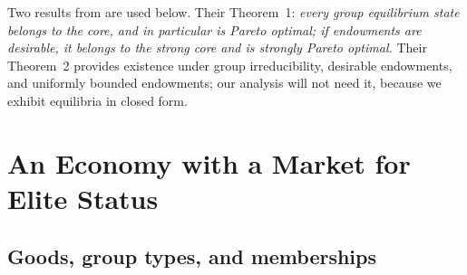 \documentclass[12pt,letterpaper]{article}
\theoremstyle{definition}
\begin{document}
Two results from \citet{ellickson2006organization} are used below.
Their Theorem~1: \emph{every group equilibrium state belongs to the core, and in particular is Pareto optimal; if endowments are desirable, it belongs to the strong core and is strongly Pareto optimal.}
Their Theorem~2 provides existence under group irreducibility, desirable endowments, and uniformly bounded endowments; our analysis will not need it, because we exhibit equilibria in closed form.

\section{An Economy with a Market for Elite Status}\label{sec:model}

\subsection{Goods, group types, and memberships}
\end{document}

